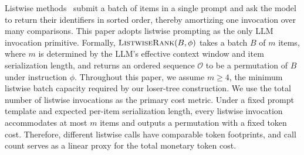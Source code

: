 Listwise methods~\cite{DBLP:conf/sigir/ZhuangZKZ24, DBLP:conf/emnlp/0001YMWRCYR23, DBLP:journals/corr/abs-2603-17223, DBLP:journals/corr/abs-2305-02156} submit a batch of items in a single prompt and ask the model to return their identifiers in sorted order, thereby amortizing one invocation over many comparisons.
This paper adopts listwise prompting as the only LLM invocation primitive.
Formally, $\textsc{ListwiseRank}(B,\phi)$ takes a batch $B$ of $m$ items, where $m$ is determined by the LLM's effective context window and item serialization length, and returns an ordered sequence $\mathcal{O}$ to be a permutation of $B$ under instruction $\phi$. Throughout this paper, we assume $m\ge 4$, the minimum listwise batch capacity required by our loser-tree construction.
We use the total number of listwise invocations as the primary cost metric. Under a fixed prompt template and expected per-item serialization length, every listwise invocation accommodates at most $m$ items and outputs a permutation with a fixed token cost. 
Therefore, different listwise calls have comparable token footprints, and call count serves as a linear proxy for the total monetary token cost. 


